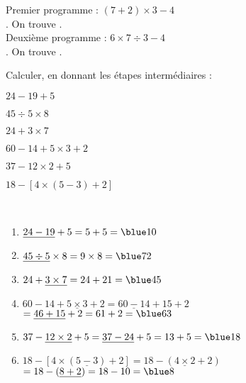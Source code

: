 \documentclass[nocrop]{sesamanuel_college_5e_new}
\begin{document}
\begin{colonne*exercice}
\begin{corrige}
   Premier programme : {\blue $(7 + 2)\times3-4$} \\ [1mm]
   . On trouve {}. \\
   Deuxième programme :  {\blue $6\times7\div3-4$} \\ [1mm]
   . On trouve {}.
\end{corrige}

\bigskip


\begin{exercice} %
  Calculer, en donnant les étapes intermédiaires :
   \begin{colenumerate}{2}
      \item $24-19+5$ \smallskip
      \item $45\div5\times8$ \smallskip
      \item $24+3\times7$
      \item $60-14+5\times3+2$
      \item $37-12\times2+5$
      \item $18-[4\times(5-3)+2]$
\end{colenumerate}
\end{exercice}

\begin{corrige}
   \ \\ [-5mm]
   \begin{enumerate}
      \item $\underline{24-19}+5 =5+5 =\blue 10$ \smallskip
      \item $\underline{45\div5}\times8 =9\times8 =\blue 72$ \smallskip
      \item $24+\underline{3\times7} =24+21 =\blue 45$ \smallskip
      \item $60-14+\underline{5\times3}+2 =\underline{60-14}+15+2$ \\
         \hspace*{33mm} $=\underline{46+15}+2 =61+2 =\blue 63$ \smallskip
      \item $37-\underline{12\times2}+5 =\underline{37-24}+5 =13+5 =\blue 18$ \smallskip
      \item $18-[4\times(\underline{5-3})+2] =18-(\underline{4\times2}+2)$ \\
         \hspace*{35.6mm} $=18-(\underline{8+2}) =18-10 =\blue 8$
   \end{enumerate}
\end{corrige}


\end{colonne*exercice}
\end{document}
